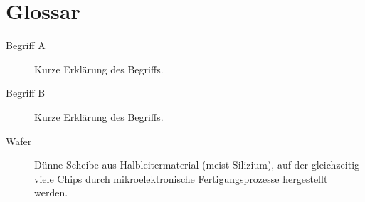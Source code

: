 \section*{Glossar}

\begin{description}
	\item[Begriff A] Kurze Erklärung des Begriffs.

	\item[Begriff B] Kurze Erklärung des Begriffs.

	\item[Wafer] Dünne Scheibe aus Halbleitermaterial (meist Silizium), auf der gleichzeitig viele Chips durch mikroelektronische Fertigungsprozesse hergestellt werden.
\end{description}
